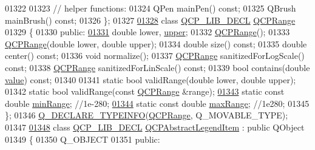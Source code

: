 \begin{DoxyCode}
01322 
01323   \textcolor{comment}{// helper functions:}
01324   QPen mainPen() \textcolor{keyword}{const};
01325   QBrush mainBrush() \textcolor{keyword}{const};
01326 \};
01327 
\hypertarget{a00116_source_l01328}{}\hyperlink{a00049}{01328} \textcolor{keyword}{class }\hyperlink{a00116_a5eaab02224a642ded7fb8951e973a02c}{QCP\_LIB\_DECL} \hyperlink{a00049}{QCPRange}
01329 \{
01330 \textcolor{keyword}{public}:
\hypertarget{a00116_source_l01331}{}\hyperlink{a00049_ae44eb3aafe1d0e2ed34b499b6d2e074f}{01331}   \textcolor{keywordtype}{double} lower, \hyperlink{a00049_ae44eb3aafe1d0e2ed34b499b6d2e074f}{upper};
01332   \hyperlink{a00049}{QCPRange}();
01333   \hyperlink{a00049}{QCPRange}(\textcolor{keywordtype}{double} lower, \textcolor{keywordtype}{double} upper);
01334   \textcolor{keywordtype}{double} size() \textcolor{keyword}{const};
01335   \textcolor{keywordtype}{double} center() \textcolor{keyword}{const};
01336   \textcolor{keywordtype}{void} normalize();
01337   \hyperlink{a00049}{QCPRange} sanitizedForLogScale() \textcolor{keyword}{const};
01338   \hyperlink{a00049}{QCPRange} sanitizedForLinScale() \textcolor{keyword}{const};
01339   \textcolor{keywordtype}{bool} contains(\textcolor{keywordtype}{double} \hyperlink{a00116_aee90379adb0307effb138f4871edbc5c}{value}) \textcolor{keyword}{const};
01340   
01341   \textcolor{keyword}{static} \textcolor{keywordtype}{bool} validRange(\textcolor{keywordtype}{double} lower, \textcolor{keywordtype}{double} upper);
01342   \textcolor{keyword}{static} \textcolor{keywordtype}{bool} validRange(\textcolor{keyword}{const} \hyperlink{a00049}{QCPRange} &range);
\hypertarget{a00116_source_l01343}{}\hyperlink{a00049_ab46d3bc95030ee25efda41b89e2b616b}{01343}   \textcolor{keyword}{static} \textcolor{keyword}{const} \textcolor{keywordtype}{double} \hyperlink{a00049_ab46d3bc95030ee25efda41b89e2b616b}{minRange}; \textcolor{comment}{//1e-280;}
\hypertarget{a00116_source_l01344}{}\hyperlink{a00049_a5ca51e7a2dc5dc0d49527ab171fe1f4f}{01344}   \textcolor{keyword}{static} \textcolor{keyword}{const} \textcolor{keywordtype}{double} \hyperlink{a00049_a5ca51e7a2dc5dc0d49527ab171fe1f4f}{maxRange}; \textcolor{comment}{//1e280;}
01345 \};
01346 \hyperlink{a00116_ae6c02a20d51ce03bc5dfd27c25a1cc6a}{Q\_DECLARE\_TYPEINFO}(\hyperlink{a00049}{QCPRange}, Q\_MOVABLE\_TYPE);
01347 
\hypertarget{a00116_source_l01348}{}\hyperlink{a00023}{01348} \textcolor{keyword}{class }\hyperlink{a00116_a5eaab02224a642ded7fb8951e973a02c}{QCP\_LIB\_DECL} \hyperlink{a00023}{QCPAbstractLegendItem} : \textcolor{keyword}{public} QObject
01349 \{
01350   Q\_OBJECT
01351 \textcolor{keyword}{public}:

\end{DoxyCode}
